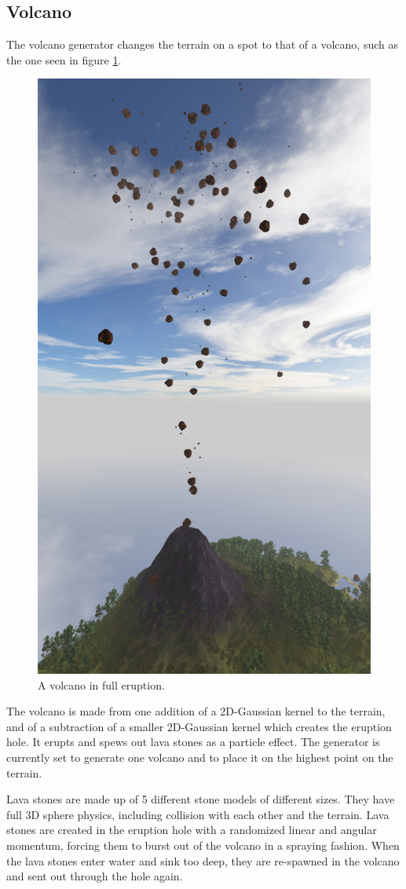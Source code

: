 \newpage
\subsection{Volcano}
The volcano generator changes the terrain on a spot to that of a volcano, such as the one seen in figure \ref{fig:volcano1}.
\begin{figure}[H]
  \centering
  \includegraphics[width=0.7\linewidth]{images/volcano.jpg}
  \caption{A volcano in full eruption.}
  \label{fig:volcano1}
\end{figure}%
\newpage
The volcano is made from one addition of a 2D-Gaussian kernel to the terrain, and of a subtraction of a smaller 2D-Gaussian kernel which creates the eruption hole. It erupts and spews out lava stones as a particle effect. The generator is currently set to generate one volcano and to place it on the highest point on the terrain.

Lava stones are made up of 5 different stone models of different sizes. They have full 3D sphere physics, including collision with each other and the terrain. Lava stones are created in the eruption hole with a randomized linear and angular momentum, forcing them to burst out of the volcano in a spraying fashion. When the lava stones enter water and sink too deep, they are re-spawned in the volcano and sent out through the hole again.

